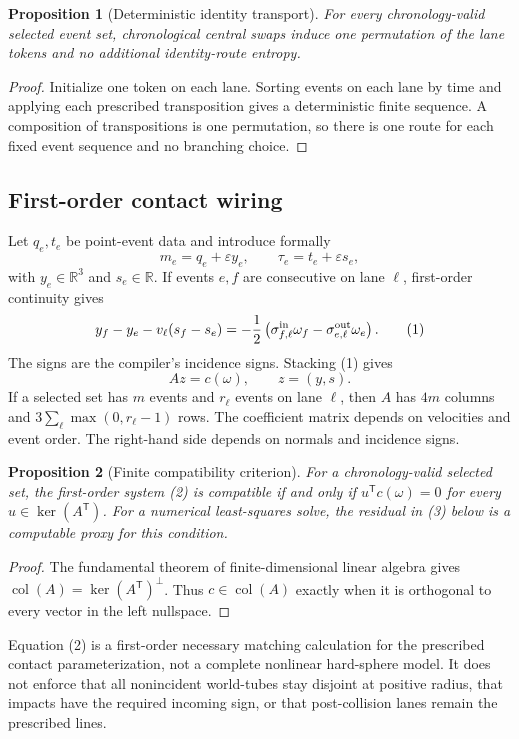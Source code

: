 \documentclass[11pt]{article}
\newtheorem{proposition}{Proposition}[section]
\theoremstyle{definition}
\theoremstyle{remark}
\newcommand{\R}{\mathbb R}
\newcommand{\T}{\mathsf T}
\newcommand{\col}{\operatorname{col}}
\newcommand{\kerp}{\operatorname{ker}}
\newcommand{\eps}{\varepsilon}
\begin{document}
\begin{proposition}[Deterministic identity transport]
For every chronology-valid selected event set, chronological central swaps induce one permutation of the lane tokens and no additional identity-route entropy.
\end{proposition}
\begin{proof}
Initialize one token on each lane. Sorting events on each lane by time and applying each prescribed transposition gives a deterministic finite sequence. A composition of transpositions is one permutation, so there is one route for each fixed event sequence and no branching choice.\end{proof}

\subsection{First-order contact wiring}
Let $q_e,t_e$ be point-event data and introduce formally
\[
 m_e=q_e+\eps y_e,\qquad \tau_e=t_e+\eps s_e,
\]
with $y_e\in\R^3$ and $s_e\in\R$. If events $e,f$ are consecutive on lane $\ell$, first-order continuity gives
\[
 y_f-y_e-v_\ell(s_f-s_e)
 =-\frac12\left(\sigma^{\rm in}_{f,\ell}\omega_f-
                   \sigma^{\rm out}_{e,\ell}\omega_e\right).
 \tag{1}
\]
The signs are the compiler's incidence signs. Stacking (1) gives
\[
 A z=c(\omega),\qquad z=(y,s). \tag{2}
\]
If a selected set has $m$ events and $r_\ell$ events on lane $\ell$, then $A$ has $4m$ columns and $3\sum_\ell\max(0,r_\ell-1)$ rows. The coefficient matrix depends on velocities and event order. The right-hand side depends on normals and incidence signs.

\begin{proposition}[Finite compatibility criterion]
For a chronology-valid selected set, the first-order system (2) is compatible if and only if $u^\T c(\omega)=0$ for every $u\in\kerp(A^\T)$. For a numerical least-squares solve, the residual in (3) below is a computable proxy for this condition.
\end{proposition}
\begin{proof}
The fundamental theorem of finite-dimensional linear algebra gives $\col(A)=\kerp(A^\T)^\perp$. Thus $c\in\col(A)$ exactly when it is orthogonal to every vector in the left nullspace.\end{proof}

Equation (2) is a first-order necessary matching calculation for the prescribed contact parameterization, not a complete nonlinear hard-sphere model. It does not enforce that all nonincident world-tubes stay disjoint at positive radius, that impacts have the required incoming sign, or that post-collision lanes remain the prescribed lines.
\end{document}
